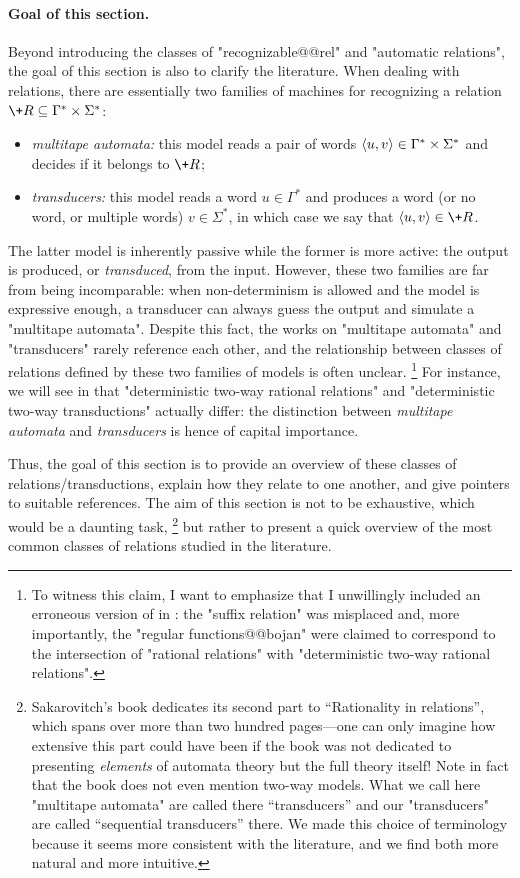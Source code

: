 \paragraph*{Goal of this section.}
Beyond introducing the classes of "recognizable@@rel" and "automatic relations", the goal of
this section is also to clarify the literature. When dealing with relations, there are essentially 
two families of machines for recognizing a relation $\+R \subseteq \Gamma^* \times \Sigma^*$:
\begin{itemize}
	\item \emph{multitape automata:} this model reads a pair of words $\langle u,v\rangle \in \Gamma^* \times \Sigma^*$ and decides if it belongs to $\+R$;
	\item \emph{transducers:} this model reads a word $u \in \Gamma^*$ and produces a word (or no word, or multiple words) $v\in \Sigma^*$, in which case we say that $\tup{u,v} \in \+R$.  
\end{itemize}
The latter model is inherently passive while the former is more active: the output is produced,
or \emph{transduced}, from the input. However, these two families are far from being incomparable:
when non-determinism is allowed and the model is expressive enough, a transducer can always guess the output and simulate a "multitape automata". Despite this fact, the works on "multitape automata" and "transducers" rarely reference each other, and the relationship between classes
of relations defined by these two families of models is often unclear.%
\footnote{To witness this claim, I want to emphasize that I unwillingly included an erroneous 
version of  in \cite{Morvan2025Algebras}:
the "suffix relation" was misplaced and, more
importantly, the "regular functions@@bojan" were claimed to correspond to
the intersection of "rational relations" with "deterministic two-way rational relations".}
For instance, we will see in 
that "deterministic two-way rational relations"
and "deterministic two-way transductions" actually differ: the distinction
between \emph{multitape automata} and \emph{transducers} is hence of capital importance.

Thus, the goal of this section is to provide an overview of these classes of relations/transductions, explain how they relate to one another, and give pointers to suitable references.
The aim of this section is not to be exhaustive, which would be a daunting task,%
\footnote{Sakarovitch's book \cite{Sakarovitch2009Elements}
dedicates its second part to ``Rationality in relations'', which spans over more than two hundred pages---one can only imagine how extensive this part could have been if the book was not
dedicated to presenting \emph{elements} of automata theory but the full theory itself!
Note in fact that the book does not even mention two-way models.
What we call here "multitape automata" are called there ``transducers''
and our "transducers" are called ``sequential transducers'' there.
We made this choice of terminology because it seems more consistent with
the literature, and we find both more natural and more intuitive.}
but rather to present a quick overview of the most common classes of relations
studied in the literature.

